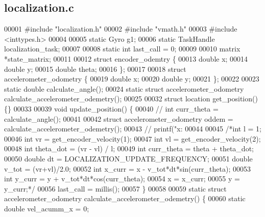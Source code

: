 \subsection{localization.\+c}
\label{a00119_source}

\begin{DoxyCode}
00001 \textcolor{preprocessor}{#include "localization.h"}
00002 \textcolor{preprocessor}{#include "vmath.h"}
00003 \textcolor{preprocessor}{#include <inttypes.h>}
00004 
00005 \textcolor{keyword}{static} Gyro g1;
00006 \textcolor{keyword}{static} TaskHandle localization_task;
00007 
00008 \textcolor{keyword}{static} \textcolor{keywordtype}{int} last_call = 0;
00009 
00010 matrix *state_matrix;
00011 
00012 \textcolor{keyword}{struct }encoder_odemtry \{
00013   \textcolor{keywordtype}{double} x;
00014   \textcolor{keywordtype}{double} y;
00015   \textcolor{keywordtype}{double} theta;
00016 \};
00017 
00018 \textcolor{keyword}{struct }accelerometer_odometry \{
00019   \textcolor{keywordtype}{double} x;
00020   \textcolor{keywordtype}{double} y;
00021 \};
00022 
00023 \textcolor{keyword}{static} \textcolor{keywordtype}{double} calculate_angle();
00024 \textcolor{keyword}{static} \textcolor{keyword}{struct }accelerometer_odometry calculate_accelerometer_odemetry();
00025 
00032 \textcolor{keyword}{struct }location get_position() \{\}
00033 
00039 \textcolor{keywordtype}{void} update_position() \{
00040   \textcolor{comment}{// int curr\_theta = calculate\_angle();}
00041 
00042   \textcolor{keyword}{struct }accelerometer_odometry oddem = calculate_accelerometer_odemetry();
00043   \textcolor{comment}{// printf("x: %
00044 
00045   \textcolor{comment}{/*int l = 1;}
00046 \textcolor{comment}{  int vr = get\_encoder\_velocity(1);}
00047 \textcolor{comment}{  int vl = get\_encoder\_velocity(2);}
00048 \textcolor{comment}{  int theta\_dot = (vr - vl) / l;}
00049 \textcolor{comment}{  int curr\_theta = theta + theta\_dot;}
00050 \textcolor{comment}{  double dt = LOCALIZATION\_UPDATE\_FREQUENCY;}
00051 \textcolor{comment}{  double v\_tot = (vr+vl)/2.0;}
00052 \textcolor{comment}{  int x\_curr = x - v\_tot*dt*sin(curr\_theta);}
00053 \textcolor{comment}{  int y\_curr = y + v\_tot*dt*cos(curr\_theta);}
00054 \textcolor{comment}{  x = x\_curr;}
00055 \textcolor{comment}{  y = y\_curr;*/}
00056   last_call = millis();
00057 \}
00058 
00059 \textcolor{keyword}{static} \textcolor{keyword}{struct }accelerometer_odometry calculate_accelerometer_odemetry() \{
00060   \textcolor{keyword}{static} \textcolor{keywordtype}{double} vel\_acumm\_x = 0;
}
\end{DoxyCode}
